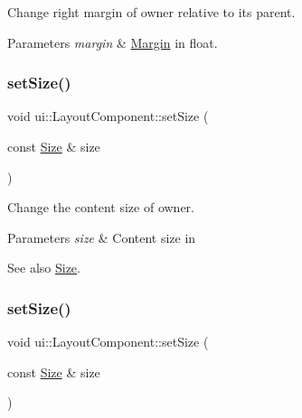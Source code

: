 Change right margin of owner relative to its parent. 
\begin{DoxyParams}{Parameters}
{\em margin} & \hyperlink{classui_1_1Margin}{Margin} in float. \\
\hline
\end{DoxyParams}
\mbox{\label{classui_1_1LayoutComponent_a22fea5cb274bb846dd45c6e212e8b9e3}} 
\subsubsection{\texorpdfstring{set\+Size()}{setSize()}\hspace{0.1cm}{\footnotesize\ttfamily [1/2]}}
{\footnotesize\ttfamily void ui\+::\+Layout\+Component\+::set\+Size (\begin{DoxyParamCaption}\item[{const \hyperlink{classSize}{Size} \&}]{size }\end{DoxyParamCaption})}

Change the content size of owner. 
\begin{DoxyParams}{Parameters}
{\em size} & Content size in \\
\hline
\end{DoxyParams}
\begin{DoxySeeAlso}{See also}
{\ttfamily \hyperlink{classSize}{Size}}. 
\end{DoxySeeAlso}
\mbox{\label{classui_1_1LayoutComponent_a22fea5cb274bb846dd45c6e212e8b9e3}} 
\subsubsection{\texorpdfstring{set\+Size()}{setSize()}\hspace{0.1cm}{\footnotesize\ttfamily [2/2]}}
{\footnotesize\ttfamily void ui\+::\+Layout\+Component\+::set\+Size (\begin{DoxyParamCaption}\item[{const \hyperlink{classSize}{Size} \&}]{size }\end{DoxyParamCaption})}


